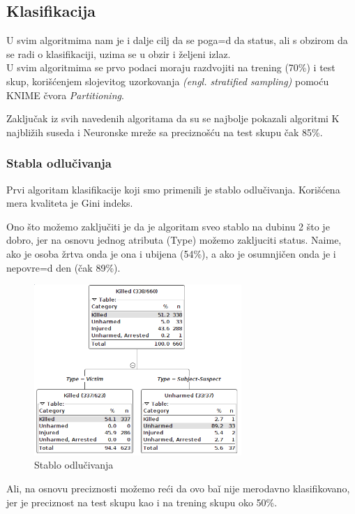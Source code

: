 \documentclass[12pt, a4paper]{article}
\def\dj{\leavevmode\setbox0=\hbox{d}\kern0pt
\rlap{\kern.215em\raise.46\ht0\hbox{-}}d}
\begin{document}
\subsection{Klasifikacija}
U svim algoritmima nam je i dalje cilj da se poga\dj a status, ali s obzirom da se radi o klasifikaciji, uzima se u obzir i \v zeljeni izlaz.\\
U svim algoritmima se prvo podaci moraju razdvojiti na trening (70\%) i test skup, kori\v s\' cenjem slojevitog uzorkovanja \textit{(engl. stratified sampling)} pomo\' cu KNIME \v cvora \textit{Partitioning}.\break

Zaklju\v cak iz svih navedenih algoritama da su se najbolje pokazali algoritmi K najbli\v zih suseda i Neuronske mre\v ze sa precizno\v s\' cu na test skupu \v cak 85\%.

\subsubsection{Stabla odlu\v civanja}
Prvi algoritam klasifikacije koji smo primenili je stablo odlu\v civanja.
Kori\v s\' cena mera kvaliteta je Gini indeks.

Ono \v sto mo\v zemo zaklju\v citi je da je algoritam sveo stablo na dubinu 2 \v sto je dobro, jer na osnovu jednog atributa (Type) mo\v zemo zakljuciti status. Naime, ako je 
osoba \v zrtva onda je ona i ubijena (54\%), a ako je osumnji\v cen onda je i nepovre\dj en (\v cak 89\%).\break

\begin{figure}[H]
\centering
\includegraphics[width=0.7\textwidth]{treeClassifier_tree_childrenKI.png}
\caption{Stablo odlu\v civanja}
\end{figure}

Ali, na osnovu preciznosti mo\v zemo re\' ci da ovo ba\v i nije merodavno klasifikovano, jer je preciznost na test skupu kao i na trening skupu oko 50\%.
\end{document}
